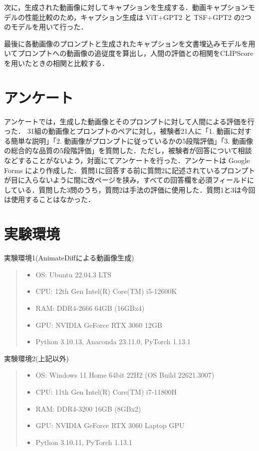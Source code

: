 \documentclass[11pt,a4j]{jreport}
\begin{document}
次に，生成された動画像に対してキャプションを生成する．動画キャプションモデルの性能比較のため，キャプション生成は ViT+GPT2 \cite{vit+gpt2} と TSF+GPT2 \cite{tsf+gpt2} の2つのモデルを用いて行った．

最後に各動画像のプロンプトと生成されたキャプションを文書埋込みモデルを用いてプロンプトへの動画像の追従度を算出し，人間の評価との相関をCLIPScoreを用いたときの相関と比較する．

\section{アンケート}

アンケートでは，生成した動画像とそのプロンプトに対して人間による評価を行った． 31組の動画像とプロンプトのペアに対し，被験者21人に「1. 動画に対する簡単な説明」「2. 動画像がプロンプトに従っているかの5段階評価」「3. 動画像の総合的な品質の5段階評価」を質問した．ただし，被験者が回答について相談などすることがないよう，対面にてアンケートを行った．アンケートは Google Forms により作成した．質問1に回答する前に質問2に記述されているプロンプトが目に入らないように間に改ページを挟み，すべての回答欄を必須フィールドにしている．質問した3問のうち，質問2は手法の評価に使用した．質問1と3は今回は使用することはなかった．

\section{実験環境}

実験環境1(AnimateDiffによる動画像生成)

\begin{quote}\begin{itemize}
    \item OS: Ubuntu 22.04.3 LTS
    \item CPU: 12th Gen Intel(R) Core(TM) i5-12600K
    \item RAM: DDR4-2666 64GB (16GBx4)
    \item GPU: NVIDIA GeForce RTX 3060 12GB
    \item Python 3.10.13, Anaconda 23.11.0, PyTorch 1.13.1
\end{itemize}\end{quote}

実験環境2(上記以外)

\begin{quote}\begin{itemize}
    \item OS: Windows 11 Home 64bit 22H2 (OS Build 22621.3007)
    \item CPU: 11th Gen Intel(R) Core(TM) i7-11800H
    \item RAM: DDR4-3200 16GB (8GBx2)
    \item GPU: NVIDIA GeForce RTX 3060 Laptop GPU
    \item Python 3.10.11, PyTorch 1.13.1
\end{itemize}\end{quote}
\end{document}
